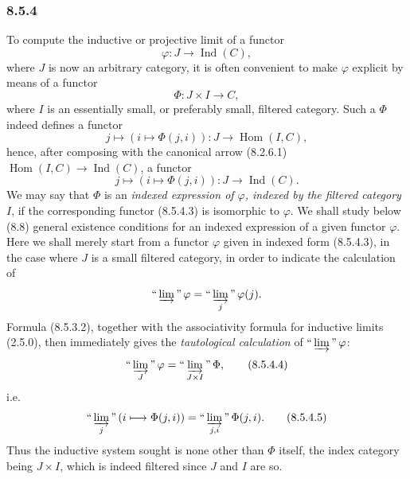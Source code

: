 \documentclass[11pt]{article}
\newcommand{\Ind}{\operatorname{Ind}}
\newcommand{\Hhom}{\operatorname{Hom}}
\begin{document}
\subsubsection*{8.5.4}
To compute the inductive or projective limit of a functor
\[
\varphi:J\longrightarrow\Ind(C),
\tag{8.5.4.1}
\]
where $J$ is now an arbitrary category, it is often convenient to make $\varphi$ explicit by means of a functor
\[
\Phi:J\times I\longrightarrow C,
\tag{8.5.4.2}
\]
where $I$ is an essentially small, or preferably small, filtered category. Such a $\Phi$ indeed defines a functor
\[
j\longmapsto (i\longmapsto \Phi(j,i)):
J\longrightarrow\Hhom(I,C),
\]
hence, after composing with the canonical arrow (8.2.6.1) $\Hhom(I,C)\to\Ind(C)$, a functor
\[
j\longmapsto (i\longmapsto \Phi(j,i)):
J\longrightarrow\Ind(C).
\tag{8.5.4.3}
\]
We may say that $\Phi$ is an \emph{indexed expression of $\varphi$, indexed by the filtered category $I$}, if the corresponding functor (8.5.4.3) is isomorphic to $\varphi$. We shall study below (8.8) general existence conditions for an indexed expression of a given functor $\varphi$. Here we shall merely start from a functor $\varphi$ given in indexed form (8.5.4.3), in the case where $J$ is a small filtered category, in order to indicate the calculation of
\[
\textrm{``}\varinjlim\textrm{''}\,\varphi=\textrm{``}\varinjlim_j\textrm{''}\,\varphi(j).
\]
Formula (8.5.3.2), together with the associativity formula for inductive limits (2.5.0), then immediately gives the \emph{tautological calculation} of $\textrm{``}\varinjlim\textrm{''}\,\varphi$:
\[
\textrm{``}\varinjlim_J\textrm{''}\,\varphi
=\textrm{``}\varinjlim_{J\times I}\textrm{''}\,\Phi,
\tag{8.5.4.4}
\]
i.e.
\[
\textrm{``}\varinjlim_j\textrm{''}\,(i\longmapsto\Phi(j,i))
=\textrm{``}\varinjlim_{j,i}\textrm{''}\,\Phi(j,i).
\tag{8.5.4.5}
\]
Thus the inductive system sought is none other than $\Phi$ itself, the index category being $J\times I$, which is indeed filtered since $J$ and $I$ are so.
\end{document}
